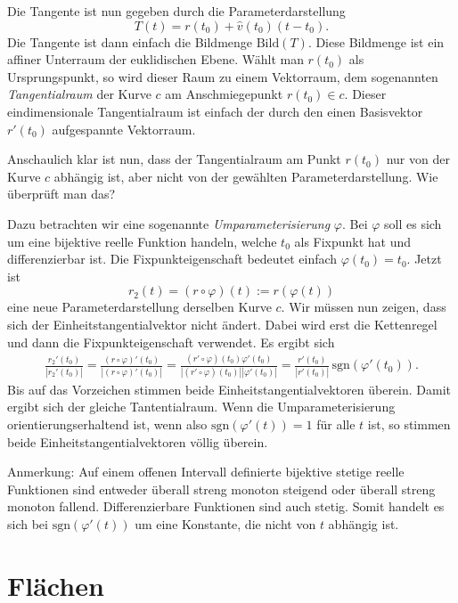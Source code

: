 \documentclass[a4paper,12pt,fleqn,dvipdfmx]{article}
\begin{document}
Die Tangente ist nun gegeben durch die Parameterdarstellung
\begin{equation}
T(t) = r(t_0)+\hat v(t_0)(t-t_0).
\end{equation}
Die Tangente ist dann einfach die Bildmenge $\mathrm{Bild}(T)$.
Diese Bildmenge ist ein affiner Unterraum der euklidischen
Ebene. Wählt man $r(t_0)$ als Ursprungspunkt, so wird dieser Raum
zu einem Vektorraum, dem sogenannten \textit{Tangentialraum} der
Kurve $c$ am Anschmiegepunkt $r(t_0)\in c$. Dieser
eindimensionale Tangentialraum ist einfach der durch den
einen Basisvektor $r'(t_0)$ aufgespannte Vektorraum.

Anschaulich klar ist nun, dass der Tangentialraum am Punkt $r(t_0)$
nur von der Kurve $c$ abhängig ist, aber nicht von der gewählten
Parameterdarstellung. Wie überprüft man das?

Dazu betrachten wir eine sogenannte \textit{Umparameterisierung}
$\varphi$. Bei $\varphi$ soll es sich um eine bijektive
reelle Funktion handeln, welche $t_0$ als Fixpunkt hat und
differenzierbar ist. Die Fixpunkteigenschaft bedeutet einfach
$\varphi(t_0)=t_0$. Jetzt ist
\begin{equation}
r_2(t) = (r\circ\varphi)(t):=r(\varphi(t))
\end{equation}
eine neue Parameterdarstellung derselben Kurve $c$.
Wir müssen nun zeigen, dass sich der Einheitstangentialvektor
nicht ändert. Dabei wird erst die Kettenregel und dann die
Fixpunkteigenschaft verwendet. Es ergibt sich
\begin{gather*}
\frac{r_2'(t_0)}{|r_2'(t_0)|}
= \frac{(r\circ\varphi)'(t_0)}{|(r\circ\varphi)'(t_0)|}
= \frac{(r'\circ\varphi)(t_0)\varphi'(t_0)}{|(r'\circ\varphi)(t_0)||\varphi'(t_0)|}
= \frac{r'(t_0)}{|r'(t_0)|}\,\mathrm{sgn}(\varphi'(t_0)).
\end{gather*}
Bis auf das Vorzeichen stimmen beide Einheitstangentialvektoren
überein. Damit ergibt sich der gleiche Tantentialraum. Wenn die
Umparameterisierung orientierungserhaltend ist, wenn also
$\mathrm{sgn}(\varphi'(t))=1$ für alle $t$ ist, so stimmen
beide Einheitstangentialvektoren völlig überein.

Anmerkung: Auf einem offenen Intervall definierte bijektive
stetige reelle
Funktionen sind entweder überall streng monoton steigend oder überall
streng monoton fallend. Differenzierbare Funktionen sind auch stetig.
Somit handelt es sich bei $\mathrm{sgn}(\varphi'(t))$ um eine
Konstante, die nicht von $t$ abhängig ist.

\section{Flächen}
\end{document}
